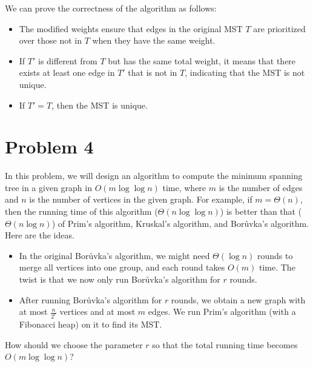 We can prove the correctness of the algorithm as follows:
\begin{itemize}
    \item The modified weights ensure that edges in the original MST \( T \) are prioritized over those not in \( T \) when they have the same weight.
    \item If \( T' \) is different from \( T \) but has the same total weight, it means that there exists at least one edge in \( T' \) that is not in \( T \), indicating that the MST is not unique.
    \item If \( T' = T \), then the MST is unique.
\end{itemize}


\section*{Problem 4}
In this problem, we will design an algorithm to compute the minimum spanning tree in a given graph in $O(m \log \log n)$ time, where $m$ is the number of edges and $n$ is the number of vertices in the given graph. For example, if $m = \Theta(n)$, then the running time of this algorithm ($\Theta(n \log \log n)$) is better than that ($\Theta(n \log n)$) of Prim's algorithm, Kruskal's algorithm, and Bor\r{u}vka's algorithm.
Here are the ideas.
\begin{itemize}
    \item In the original Bor\r{u}vka's algorithm, we might need $\Theta(\log n)$ rounds to merge all vertices into one group, and each round takes $O(m)$ time. The twist is that we now only run Bor\r{u}vka's algorithm for $r$ rounds.
    \item After running Bor\r{u}vka's algorithm for $r$ rounds, we obtain a new graph with at most $\frac{n}{2^r}$ vertices and at most $m$ edges. We run Prim's algorithm (with a Fibonacci heap) on it to find its MST.
\end{itemize}
How should we choose the parameter $r$ so that the total running time becomes $O(m \log \log n)$?

